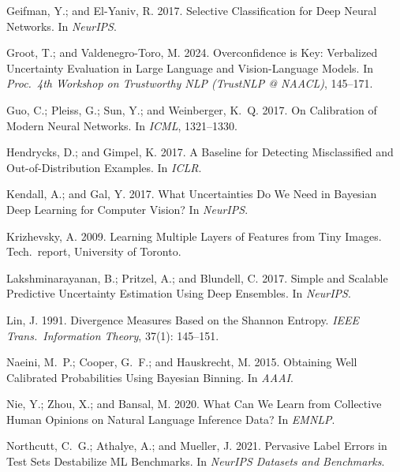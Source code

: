 \documentclass[letterpaper]{article} %
\begin{document}
\begin{thebibliography}{}
Geifman, Y.; and El-Yaniv, R. 2017.
\newblock Selective Classification for Deep Neural Networks.
\newblock In \emph{NeurIPS}.

Groot, T.; and Valdenegro-Toro, M. 2024.
\newblock Overconfidence is Key: Verbalized Uncertainty Evaluation in Large
Language and Vision-Language Models.
\newblock In \emph{Proc.\ 4th Workshop on Trustworthy NLP (TrustNLP @ NAACL)}, 145--171.

Guo, C.; Pleiss, G.; Sun, Y.; and Weinberger, K.~Q. 2017.
\newblock On Calibration of Modern Neural Networks.
\newblock In \emph{ICML}, 1321--1330.

Hendrycks, D.; and Gimpel, K. 2017.
\newblock A Baseline for Detecting Misclassified and Out-of-Distribution Examples.
\newblock In \emph{ICLR}.

Kendall, A.; and Gal, Y. 2017.
\newblock What Uncertainties Do We Need in Bayesian Deep Learning for Computer Vision?
\newblock In \emph{NeurIPS}.

Krizhevsky, A. 2009.
\newblock Learning Multiple Layers of Features from Tiny Images.
\newblock Tech.\ report, University of Toronto.

Lakshminarayanan, B.; Pritzel, A.; and Blundell, C. 2017.
\newblock Simple and Scalable Predictive Uncertainty Estimation Using Deep Ensembles.
\newblock In \emph{NeurIPS}.

Lin, J. 1991.
\newblock Divergence Measures Based on the Shannon Entropy.
\newblock \emph{IEEE Trans.\ Information Theory}, 37(1): 145--151.

Naeini, M.~P.; Cooper, G.~F.; and Hauskrecht, M. 2015.
\newblock Obtaining Well Calibrated Probabilities Using Bayesian Binning.
\newblock In \emph{AAAI}.

Nie, Y.; Zhou, X.; and Bansal, M. 2020.
\newblock What Can We Learn from Collective Human Opinions on Natural Language
Inference Data?
\newblock In \emph{EMNLP}.

Northcutt, C.~G.; Athalye, A.; and Mueller, J. 2021.
\newblock Pervasive Label Errors in Test Sets Destabilize ML Benchmarks.
\newblock In \emph{NeurIPS Datasets and Benchmarks}.


\end{thebibliography}
\end{document}
